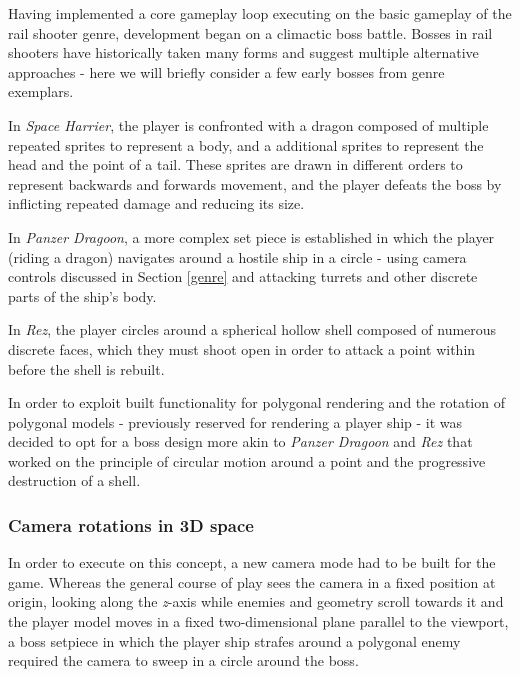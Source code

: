 \documentclass[11pt]{article}
\begin{document}

Having implemented a core gameplay loop executing on the basic gameplay of the rail shooter genre,
development began on a climactic boss battle. Bosses in rail shooters have historically taken many
forms and suggest multiple alternative approaches - here we will briefly consider a few early
bosses from genre exemplars. 

In \textit{Space Harrier}, the player is confronted with a dragon composed of multiple
repeated sprites to represent a body, and a additional sprites to represent the head and the
point of a tail. These sprites are drawn in different orders to represent backwards and forwards
movement, and the player defeats the boss by inflicting repeated damage and reducing its size.

In \textit{Panzer Dragoon}, a more complex set piece is established in which the player (riding a 
dragon) navigates around a hostile ship in a circle - using camera controls discussed in Section
\ref{genre} and attacking turrets and other discrete parts of the ship's body.

In \textit{Rez}, the player circles around a spherical hollow shell composed of numerous discrete
faces, which they must shoot open in order to attack a point within before the shell is rebuilt.

In order to exploit built functionality for polygonal rendering and the rotation of polygonal
models - previously reserved for rendering a player ship - it was decided to opt for a boss
design more akin to \textit{Panzer Dragoon} and \textit{Rez} that worked on the principle of
circular motion around a point and the progressive destruction of a shell.

\subsubsection*{Camera rotations in 3D space}


In order to execute on this concept, a new camera mode had to be built for the game.
Whereas the general course of play sees the camera in a fixed position at origin, looking
along the \textit{z}-axis while enemies and geometry scroll towards it and the player
model moves in a fixed two-dimensional plane parallel to the viewport, a boss setpiece in
which the player ship strafes around a polygonal enemy required the camera to sweep in a 
circle around the boss.
\end{document}
